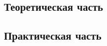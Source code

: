 \documentclass[a4paper,14pt]{extarticle}
\theoremstyle{definition}
\begin{document}

\newpage

\tableofcontents
\newpage

\begin{centering}
\section{Теоретическая часть}
\end{centering}












% 

\begin{centering}
    \section{Практическая часть}
\end{centering}





\newpage
\printbibliography
\end{document}

